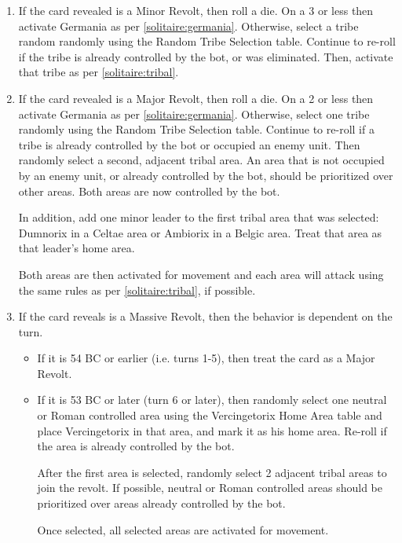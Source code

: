 \begin{enumerate}
\begin{enumerate}[leftmargin=0in]
    \item If the card revealed is a Minor Revolt, then roll a die. On a 3 or less then activate Germania as per \ref{solitaire:germania}. Otherwise, select a tribe random randomly using the Random Tribe Selection table. Continue to re-roll if the tribe is already controlled by the bot, or was eliminated. Then, activate that tribe as per \ref{solitaire:tribal}.

    \item If the card revealed is a Major Revolt, then roll a die. On a 2 or less then activate Germania as per \ref{solitaire:germania}. Otherwise, select one tribe randomly using the Random Tribe Selection table. Continue to re-roll if a tribe is already controlled by the bot or occupied an enemy unit. Then randomly select a second, adjacent tribal area. An area that is not occupied by an enemy unit, or already controlled by the bot, should be prioritized over other areas. Both areas are now controlled by the bot.

    In addition, add one minor leader to the first tribal area that was selected: Dumnorix in a Celtae area or Ambiorix in a Belgic area. Treat that area as that leader's home area.

    Both areas are then activated for movement and each area will attack using the same rules as per \ref{solitaire:tribal}, if possible.

    \item If the card reveals is a Massive Revolt, then the behavior is dependent on the turn.
    \begin{itemize}
      \item If it is 54 BC or earlier (i.e. turns 1-5), then treat the card as a Major Revolt.
      \item \label{:solitaire:massive_revolt}If it is 53 BC or later (turn 6 or later), then randomly select one neutral or Roman controlled area using the Vercingetorix Home Area table and place Vercingetorix in that area, and mark it as his home area. Re-roll if the area is already controlled by the bot.

      After the first area is selected, randomly select 2 adjacent tribal areas to join the revolt. If possible, neutral or Roman controlled areas should be prioritized over areas already controlled by the bot.

      Once selected, all selected areas are activated for movement.
    \end{itemize}
  \end{enumerate}
\end{enumerate}

